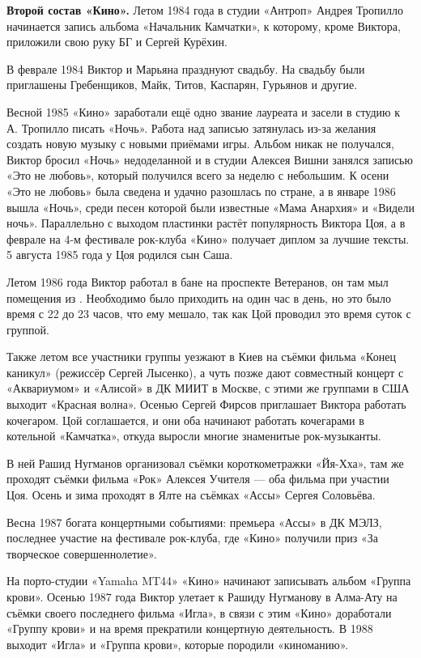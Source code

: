 \textbf{Второй состав «Кино».}
Летом 1984 года в студии «Антроп» Андрея Тропилло начинается запись альбома «Начальник Камчатки», к которому, кроме Виктора, приложили свою руку БГ и Сергей Курёхин.

В феврале 1984 Виктор и Марьяна празднуют свадьбу. На свадьбу были приглашены Гребенщиков, Майк, Титов, Каспарян, Гурьянов и другие.

Весной 1985 «Кино» заработали ещё одно звание лауреата и засели в студию к А. Тропилло писать «Ночь». Работа над записью затянулась из-за желания создать новую музыку с новыми приёмами игры. Альбом никак не получался, Виктор бросил «Ночь» недоделанной и в студии Алексея Вишни занялся записью «Это не любовь», который получился всего за неделю с небольшим. К осени «Это не любовь» была сведена и удачно разошлась по стране, а в январе 1986 вышла «Ночь», среди песен которой были известные «Мама Анархия» и «Видели ночь». Параллельно с выходом пластинки растёт популярность Виктора Цоя, а в феврале на 4-м фестивале рок-клуба «Кино» получает диплом за лучшие тексты. 5 августа 1985 года у Цоя родился сын Саша.


Летом 1986 года Виктор работал в бане на проспекте Ветеранов, он там мыл помещения из . Необходимо было приходить на один час в день, но это было время с 22 до 23 часов, что ему мешало, так как Цой проводил это время суток с группой.

Также летом все участники группы уезжают в Киев на съёмки фильма «Конец каникул» (режиссёр Сергей Лысенко), а чуть позже дают совместный концерт с «Аквариумом» и «Алисой» в ДК МИИТ в Москве, с этими же группами в США выходит «Красная волна». Осенью Сергей Фирсов приглашает Виктора работать кочегаром. Цой соглашается, и они оба начинают работать кочегарами в котельной «Камчатка», откуда выросли многие знаменитые рок-музыканты.

В ней Рашид Нугманов организовал съёмки короткометражки «Йя-Хха», там же проходят съёмки фильма «Рок» Алексея Учителя --- оба фильма при участии Цоя. Осень и зима проходят в Ялте на съёмках «Ассы» Сергея Соловьёва.

Весна 1987 богата концертными событиями: премьера «Ассы» в ДК МЭЛЗ, последнее участие на фестивале рок-клуба, где «Кино» получили приз «За творческое совершеннолетие».

На порто-студии «Yamaha MT44» «Кино» начинают записывать альбом «Группа крови». Осенью 1987 года Виктор улетает к Рашиду Нугманову в Алма-Ату на съёмки своего последнего фильма «Игла», в связи с этим «Кино» доработали «Группу крови» и на время прекратили концертную деятельность. В 1988 выходит «Игла» и «Группа крови», которые породили «киноманию».

